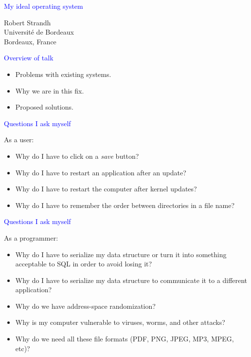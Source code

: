 \documentclass{slides}
\newcommand{\ti}[1]{\begin{center}\Large{\textcolor{blue}{#1}}\end{center}}
\begin{document}
\landscape
\setlength{\oddsidemargin}{1cm}
\setlength{\evensidemargin}{1cm}
\setlength{\marginparwidth}{1cm}
\setlength{\parskip}{0.5cm}
\setlength{\parindent}{0cm}
\begin{slide}\ti{My ideal operating system}
\vskip 0.5cm
\begin{center}
Robert Strandh \\
Université de Bordeaux \\
Bordeaux, France
\end{center}
\vfill\end{slide}
\begin{slide}\ti{Overview of talk}
\vskip 0.5cm
  \begin{itemize}
  \item Problems with existing systems.
  \item Why we are in this fix.
  \item Proposed solutions.
  \end{itemize}

\vfill\end{slide}
\begin{slide}\ti{Questions I ask myself}
\vskip 0.5cm
As a user:

  \begin{itemize}
  \item Why do I have to click on a \emph{save} button?
  \item Why do I have to restart an application after an update?
  \item Why do I have to restart the computer after kernel updates?
  \item Why do I have to remember the order between directories in a
    file name?
  \end{itemize}

\vfill\end{slide}
\begin{slide}\ti{Questions I ask myself}
\vskip 0.5cm
As a programmer:

  \begin{itemize}
  \item Why do I have to serialize my data structure or turn it into
    something acceptable to SQL in order to avoid losing it?
  \item Why do I have to serialize my data structure to communicate it
    to a different application?
  \item Why do we have address-space randomization?
  \item Why is my computer vulnerable to viruses, worms, and other
    attacks?
  \item Why do we need all these file formats (PDF, PNG, JPEG, MP3,
    MPEG, etc)?
  \end{itemize}

\vfill\end{slide}
\end{document}

